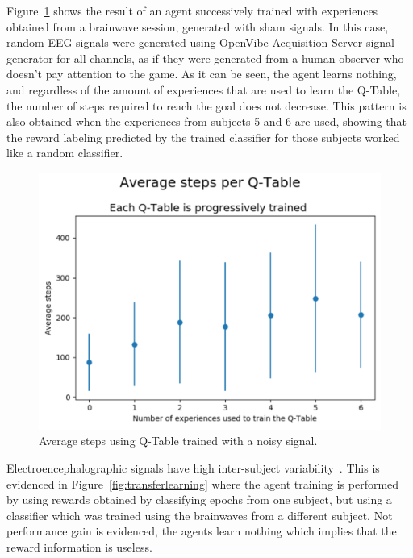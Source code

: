 \documentclass[journal]{IEEEtran}
\begin{document}
{{%

Figure~\ref{fig:avg_steps_noise} shows the result of an agent successively trained with experiences obtained from a brainwave session, generated with sham signals.  In this case, random EEG signals were generated using OpenVibe Acquisition Server signal generator for all channels, as if they were generated from a human observer who doesn't pay attention to the game.  As it can be seen, the agent learns nothing, and regardless of the amount of experiences that are used to learn the Q-Table, the number of steps required to reach the goal does not decrease.  This pattern is also obtained when the experiences from subjects 5 and 6 are used, showing that the reward labeling predicted by the trained classifier for those subjects worked like a random classifier.

\begin{figure}[h!]
\centering
\includegraphics[scale=0.4]{Images/Average_steps/noise.png}
\caption{Average steps using Q-Table trained with a noisy signal.}
\label{fig:avg_steps_noise}
\end{figure}

Electroencephalographic signals have high inter-subject variability~\cite{Chavarriaga2014}.   This is evidenced in Figure~\ref{fig:transferlearning} where the agent training is performed by using rewards obtained by classifying epochs from one subject, but using a classifier which was trained using the brainwaves from a different subject.   Not performance gain is evidenced, the agents learn nothing which implies that the reward information is useless.


}}
\end{document}
